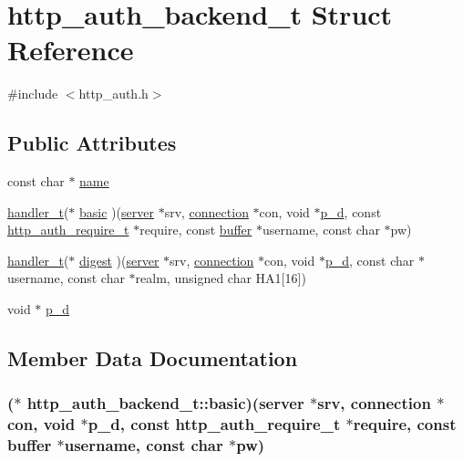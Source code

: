 \hypertarget{structhttp__auth__backend__t}{\section{http\-\_\-auth\-\_\-backend\-\_\-t Struct Reference}
\label{structhttp__auth__backend__t}
}


{\ttfamily \#include $<$http\-\_\-auth.\-h$>$}

\subsection*{Public Attributes}
\begin{DoxyCompactItemize}
\item 
const char $\ast$ \hyperlink{structhttp__auth__backend__t_aeceb871ba2cee49a52821a1de64a8cf2}{name}
\item 
\hyperlink{settings_8h_a2a8ffc3e29980db202f39ab85ab7e98e}{handler\-\_\-t}($\ast$ \hyperlink{structhttp__auth__backend__t_ad40683232e5433dbe7b7462bb2de7996}{basic} )(\hyperlink{structserver}{server} $\ast$srv, \hyperlink{structconnection}{connection} $\ast$con, void $\ast$\hyperlink{structhttp__auth__backend__t_a42f4f2b138df39db0fd46c31dbfe3bfd}{p\-\_\-d}, const \hyperlink{structhttp__auth__require__t}{http\-\_\-auth\-\_\-require\-\_\-t} $\ast$require, const \hyperlink{structbuffer}{buffer} $\ast$username, const char $\ast$pw)
\item 
\hyperlink{settings_8h_a2a8ffc3e29980db202f39ab85ab7e98e}{handler\-\_\-t}($\ast$ \hyperlink{structhttp__auth__backend__t_a21f07bcb98ee7882ba72eee5f39c5ec2}{digest} )(\hyperlink{structserver}{server} $\ast$srv, \hyperlink{structconnection}{connection} $\ast$con, void $\ast$\hyperlink{structhttp__auth__backend__t_a42f4f2b138df39db0fd46c31dbfe3bfd}{p\-\_\-d}, const char $\ast$username, const char $\ast$realm, unsigned char H\-A1\mbox{[}16\mbox{]})
\item 
void $\ast$ \hyperlink{structhttp__auth__backend__t_a42f4f2b138df39db0fd46c31dbfe3bfd}{p\-\_\-d}
\end{DoxyCompactItemize}


\subsection{Member Data Documentation}
\hypertarget{structhttp__auth__backend__t_ad40683232e5433dbe7b7462bb2de7996}{
\subsubsection[{basic}]{($\ast$ http\-\_\-auth\-\_\-backend\-\_\-t\-::basic)({\bf server} $\ast$srv, {\bf connection} $\ast$con, void $\ast${\bf p\-\_\-d}, const {\bf http\-\_\-auth\-\_\-require\-\_\-t} $\ast$require, const {\bf buffer} $\ast$username, const char $\ast$pw)}}\label{structhttp__auth__backend__t_ad40683232e5433dbe7b7462bb2de7996}


